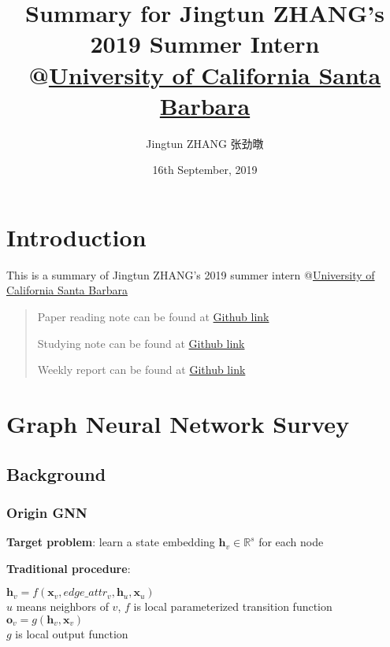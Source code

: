 \documentclass[]{article}
\title{
    Summary for Jingtun ZHANG's 2019 Summer Intern \\
    @\href{https://ucsb.edu}{University of California Santa Barbara}
}
\author{
    Jingtun ZHANG 张劲暾
}
\date{  16th September, 2019   }
\begin{document}
\maketitle
\tableofcontents
\hypertarget{header-n1761}{%
\section{Introduction}\label{header-n1761}}

This is a summary of Jingtun ZHANG's 2019 summer intern
@\href{https://ucsb.edu}{University of California Santa Barbara}

\begin{quote}
Paper reading note can be found at
\href{https://github.com/OrdinaryCrazy/cnn-compiler-notebook/tree/master/paper-reading-note}{Github
link}

Studying note can be found at
\href{https://github.com/OrdinaryCrazy/cnn-compiler-notebook/tree/master/Studying\%20Note}{Github
link}

Weekly report can be found at
\href{https://github.com/OrdinaryCrazy/cnn-compiler-notebook/tree/master/weekly-report}{Github
link}
\end{quote}




\hypertarget{header-n1768}{%
\section{Graph Neural Network Survey}\label{header-n1768}}

\hypertarget{header-n1769}{%
\subsection{Background}\label{header-n1769}}

\hypertarget{header-n1770}{%
\subsubsection{Origin GNN}\label{header-n1770}}

\textbf{Target problem}: learn a state embedding
\(\mathbf{h}_v\in \mathbb{R}^{s}\) for each node

\textbf{Traditional procedure}:

\(\mathbf{h}_{v} = f(\mathbf{x}_v,edge\_attr_v,\mathbf{h}_u,\mathbf{x}_u)\)\\
\(u\) means neighbors of \(v\), \(f\) is local parameterized transition
function\\
\(\mathbf{o}_v = g(\mathbf{h}_v, \mathbf{x}_v)\)\\
\(g\) is local output function
\end{document}
